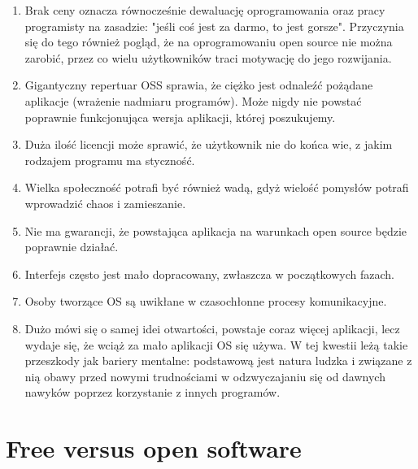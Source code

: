 \documentclass{article}
\begin{document}
\begin{enumerate}
    \item Brak ceny oznacza równocześnie dewaluację oprogramowania oraz pracy programisty na zasadzie: "jeśli coś jest za darmo, to jest gorsze". Przyczynia się do tego również pogląd, że na oprogramowaniu open source nie można zarobić, przez co wielu użytkowników traci motywację do jego rozwijania\cite{Kotula}.
    
    \item Gigantyczny repertuar OSS sprawia, że ciężko jest odnaleźć pożądane aplikacje (wrażenie nadmiaru programów). Może nigdy nie powstać poprawnie funkcjonująca wersja aplikacji, której poszukujemy\cite{Kotula}.
    
    \item Duża ilość licencji może sprawić, że użytkownik nie do końca wie, z jakim rodzajem programu ma styczność\cite{Kotula}.
    
    \item Wielka społeczność potrafi być również wadą, gdyż wielość pomysłów potrafi wprowadzić chaos i zamieszanie\cite{Kotula}.
    
    \item Nie ma gwarancji, że powstająca aplikacja na warunkach open source będzie poprawnie działać\cite{Kotula}.
    
    \item Interfejs często jest mało dopracowany, zwłaszcza w początkowych fazach\cite{Kotula}.
    
    \item Osoby tworzące OS są uwikłane w czasochłonne procesy komunikacyjne\cite{Kotula}.
    
    \item Dużo mówi się o samej idei otwartości, powstaje coraz więcej aplikacji, lecz wydaje się, że wciąż za mało aplikacji OS się używa. W tej kwestii leżą takie przeszkody jak bariery mentalne: podstawową jest natura ludzka i związane z nią obawy przed nowymi trudnościami w odzwyczajaniu się od dawnych nawyków poprzez korzystanie z innych programów\cite{Kotula}.
\end{enumerate}

\section{Free versus open software}
\end{document}
